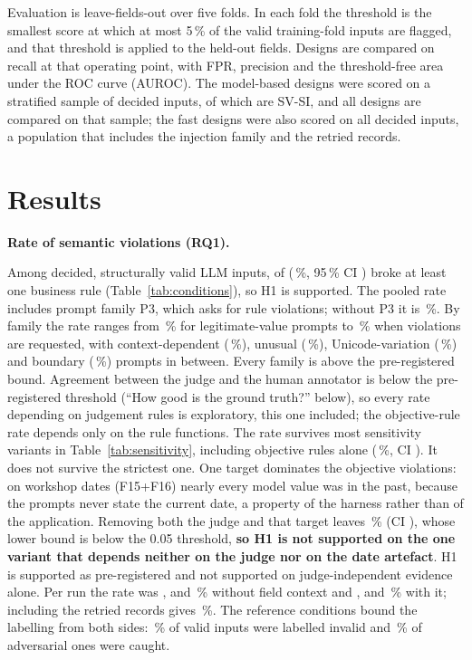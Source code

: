 \documentclass[journal]{IEEEtran}
\begin{document}
Evaluation is leave-fields-out over five folds. In each fold the threshold is the smallest score at
which at most 5\,\% of the valid training-fold inputs are flagged, and that threshold is applied to the
held-out fields. Designs are compared on recall at that operating point, with FPR, precision and the
threshold-free area under the ROC curve (AUROC). The model-based designs were scored on a stratified
sample of  decided inputs, of which  are SV-SI, and all designs are compared on that
sample; the fast designs were also scored on all  decided inputs, a population that
includes the injection family and the retried records.

\section{Results}
\label{sec:results}

\textbf{Rate of semantic violations (RQ1).} 

Among decided, structurally valid LLM inputs,  of  (\,\%, 95\,\% CI
) broke at least one business rule (Table~\ref{tab:conditions}), so H1 is supported. The
pooled rate includes prompt family P3, which asks for rule violations; without P3 it is
\,\%. By family the rate ranges from \,\% for legitimate-value
prompts to \,\% when violations are requested, with context-dependent
(\,\%), unusual (\,\%), Unicode-variation (\,\%) and
boundary (\,\%) prompts in between. Every family is above the pre-registered bound.
\ifjudgeweak Agreement between the judge and the human annotator is below the pre-registered
threshold (``How good is the ground truth?'' below), so every rate depending on judgement rules is
exploratory, this one included; the objective-rule rate depends only on the rule functions.\fi{}
The rate survives most sensitivity variants in Table~\ref{tab:sensitivity}, including objective rules
alone (\,\%, CI ). It does not survive the strictest one.
One target dominates the objective violations: on workshop dates (F15+F16) nearly every model value
was in the past, because the prompts never state the current date, a property of the harness rather
than of the application. Removing both the judge and that target leaves \,\% (CI
), whose lower bound is below the 0.05 threshold, \textbf{so H1 is not
supported on the one variant that depends neither on the judge nor on the date artefact}. H1 is
supported as pre-registered and not supported on judge-independent evidence alone. Per run the rate was ,  and \,\% without field context and
,  and \,\% with it; including the retried records gives
\,\%. The reference conditions bound the labelling from both sides: \,\%
of valid inputs were labelled invalid and \,\% of adversarial ones were caught.
\end{document}
